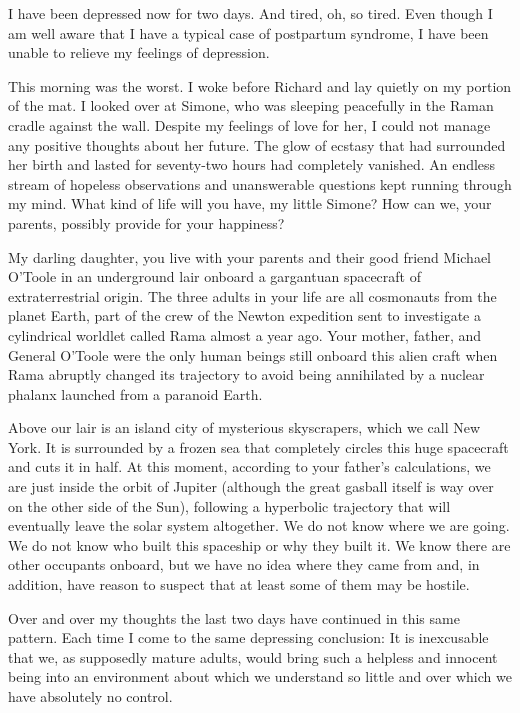 \documentclass[]{article}
\begin{document}
I have been depressed now for two days. And tired, oh, so tired. Even though I am well aware that I have a typical case of postpartum syndrome, I have been unable to relieve my feelings of depression.

This morning was the worst. I woke before Richard and lay quietly on my portion of the mat. I looked over at Simone, who was sleeping peacefully in the Raman cradle against the wall. Despite my feelings of love for her, I could not manage any positive thoughts about her future. The glow of ecstasy that had surrounded her birth and lasted for seventy-two hours had completely vanished. An endless stream of hopeless observations and unanswerable questions kept running through my mind. What kind of life will you have, my little Simone? How can we, your parents, possibly provide for your happiness?

My darling daughter, you live with your parents and their good friend Michael O’Toole in an underground lair onboard a gargantuan spacecraft of extraterrestrial origin. The three adults in your life are all cosmonauts from the planet Earth, part of the crew of the Newton expedition sent to investigate a cylindrical worldlet called Rama almost a year ago. Your mother, father, and General O’Toole were the only human beings still onboard this alien craft when Rama abruptly changed its trajectory to avoid being annihilated by a nuclear phalanx launched from a paranoid Earth.

Above our lair is an island city of mysterious skyscrapers, which we call New York. It is surrounded by a frozen sea that completely circles this huge spacecraft and cuts it in half. At this moment, according to your father’s calculations, we are just inside the orbit of Jupiter (although the great gasball itself is way over on the other side of the Sun), following a hyperbolic trajectory that will eventually leave the solar system altogether. We do not know where we are going. We do not know who built this spaceship or why they built it. We know there are other occupants onboard, but we have no idea where they came from and, in addition, have reason to suspect that at least some of them may be hostile.

Over and over my thoughts the last two days have continued in this same pattern. Each time I come to the same depressing conclusion: It is inexcusable that we, as supposedly mature adults, would bring such a helpless and innocent being into an environment about which we understand so little and over which we have absolutely no control.
\end{document}
